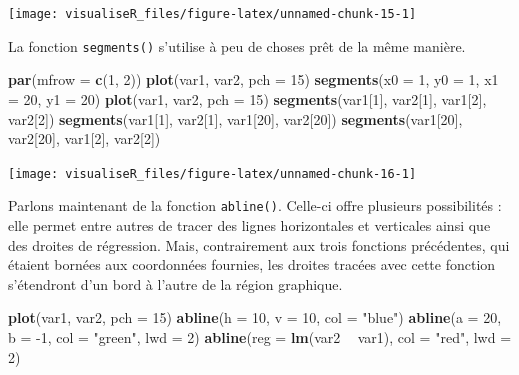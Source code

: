 \documentclass[]{article}
\newenvironment{Shaded}{\begin{snugshade}}{\end{snugshade}}
\newcommand{\DataTypeTok}[1]{\textcolor[rgb]{0.13,0.29,0.53}{#1}}
\newcommand{\DecValTok}[1]{\textcolor[rgb]{0.00,0.00,0.81}{#1}}
\newcommand{\KeywordTok}[1]{\textcolor[rgb]{0.13,0.29,0.53}{\textbf{#1}}}
\newcommand{\NormalTok}[1]{#1}
\newcommand{\OperatorTok}[1]{\textcolor[rgb]{0.81,0.36,0.00}{\textbf{#1}}}
\newcommand{\StringTok}[1]{\textcolor[rgb]{0.31,0.60,0.02}{#1}}
\begin{document}
\begin{center}\texttt{[image: visualiseR\_files/figure-latex/unnamed-chunk-15-1]} \end{center}

La fonction \texttt{segments()} s'utilise à peu de choses prêt de la même manière.

\begin{Shaded}
\begin{Highlighting}[]
\KeywordTok{par}\NormalTok{(}\DataTypeTok{mfrow =} \KeywordTok{c}\NormalTok{(}\DecValTok{1}\NormalTok{, }\DecValTok{2}\NormalTok{))}
\KeywordTok{plot}\NormalTok{(var1, var2, }\DataTypeTok{pch =} \DecValTok{15}\NormalTok{)}
\KeywordTok{segments}\NormalTok{(}\DataTypeTok{x0 =} \DecValTok{1}\NormalTok{, }\DataTypeTok{y0 =} \DecValTok{1}\NormalTok{, }\DataTypeTok{x1 =} \DecValTok{20}\NormalTok{, }\DataTypeTok{y1 =} \DecValTok{20}\NormalTok{)}
\KeywordTok{plot}\NormalTok{(var1, var2, }\DataTypeTok{pch =} \DecValTok{15}\NormalTok{)}
\KeywordTok{segments}\NormalTok{(var1[}\DecValTok{1}\NormalTok{], var2[}\DecValTok{1}\NormalTok{], var1[}\DecValTok{2}\NormalTok{], var2[}\DecValTok{2}\NormalTok{])}
\KeywordTok{segments}\NormalTok{(var1[}\DecValTok{1}\NormalTok{], var2[}\DecValTok{1}\NormalTok{], var1[}\DecValTok{20}\NormalTok{], var2[}\DecValTok{20}\NormalTok{])}
\KeywordTok{segments}\NormalTok{(var1[}\DecValTok{20}\NormalTok{], var2[}\DecValTok{20}\NormalTok{], var1[}\DecValTok{2}\NormalTok{], var2[}\DecValTok{2}\NormalTok{])}
\end{Highlighting}
\end{Shaded}

\begin{center}\texttt{[image: visualiseR\_files/figure-latex/unnamed-chunk-16-1]} \end{center}

Parlons maintenant de la fonction \texttt{abline()}. Celle-ci offre plusieurs possibilités : elle permet entre autres de tracer des lignes horizontales et verticales ainsi que des droites de régression. Mais, contrairement aux trois fonctions précédentes, qui étaient bornées aux coordonnées fournies, les droites tracées avec cette fonction s'étendront d'un bord à l'autre de la région graphique.

\begin{Shaded}
\begin{Highlighting}[]
\KeywordTok{plot}\NormalTok{(var1, var2, }\DataTypeTok{pch =} \DecValTok{15}\NormalTok{)}
\KeywordTok{abline}\NormalTok{(}\DataTypeTok{h =} \DecValTok{10}\NormalTok{, }\DataTypeTok{v =} \DecValTok{10}\NormalTok{, }\DataTypeTok{col =} \StringTok{"blue"}\NormalTok{)}
\KeywordTok{abline}\NormalTok{(}\DataTypeTok{a =} \DecValTok{20}\NormalTok{, }\DataTypeTok{b =} \DecValTok{-1}\NormalTok{, }\DataTypeTok{col =} \StringTok{"green"}\NormalTok{, }\DataTypeTok{lwd =} \DecValTok{2}\NormalTok{)}
\KeywordTok{abline}\NormalTok{(}\DataTypeTok{reg =} \KeywordTok{lm}\NormalTok{(var2 }\OperatorTok{~}\StringTok{ }\NormalTok{var1), }\DataTypeTok{col =} \StringTok{"red"}\NormalTok{, }\DataTypeTok{lwd =} \DecValTok{2}\NormalTok{)}
\end{Highlighting}
\end{Shaded}
\end{document}
